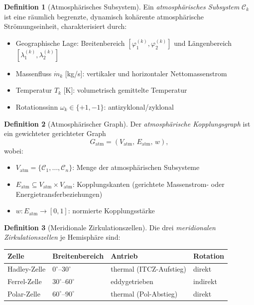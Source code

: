 ﻿\documentclass[a4paper,12pt]{article}
\theoremstyle{definition}
\newtheorem{definition}{Definition}
\begin{document}
\begin{definition}[Atmosph\"arisches Subsystem]
Ein \emph{atmosph\"arisches Subsystem} $\mathcal{C}_k$ ist eine r\"aumlich begrenzte,
dynamisch koh\"arente atmosph\"arische Str\"omungseinheit, charakterisiert durch:
\begin{itemize}
    \item Geographische Lage: Breitenbereich $[\varphi_1^{(k)}, \varphi_2^{(k)}]$
          und L\"angenbereich $[\lambda_1^{(k)}, \lambda_2^{(k)}]$
    \item Massenfluss $\dot{m}_k$ [kg/s]: vertikaler und horizontaler Nettomassenstrom
    \item Temperatur $T_k$ [K]: volumetrisch gemittelte Temperatur
    \item Rotationssinn $\omega_k \in \{+1, -1\}$: antizyklonal/zyklonal
\end{itemize}
\end{definition}

\begin{definition}[Atmosph\"arischer Graph]
Der \emph{atmosph\"arische Kopplungsgraph} ist ein gewichteter gerichteter Graph
\[
G_{\mathrm{atm}} = (V_{\mathrm{atm}},\, E_{\mathrm{atm}},\, w),
\]
wobei:
\begin{itemize}
    \item $V_{\mathrm{atm}} = \{\mathcal{C}_1, \ldots, \mathcal{C}_n\}$:
          Menge der atmosph\"arischen Subsysteme
    \item $E_{\mathrm{atm}} \subseteq V_{\mathrm{atm}} \times V_{\mathrm{atm}}$:
          Kopplungskanten (gerichtete Massenstrom- oder Energietransferbeziehungen)
    \item $w: E_{\mathrm{atm}} \to [0, 1]$: normierte Kopplungsst\"arke
\end{itemize}
\end{definition}

\begin{definition}[Meridionale Zirkulationszellen]
Die drei \emph{meridionalen Zirkulationszellen} je Hemisph\"are sind:
\begin{center}
\begin{tabular}{llll}
\toprule
Zelle & Breitenbereich & Antrieb & Rotation \\
\midrule
Hadley-Zelle  & $0^\circ$--$30^\circ$ & thermal (ITCZ-Aufstieg) & direkt \\
Ferrel-Zelle  & $30^\circ$--$60^\circ$ & eddygetrieben           & indirekt \\
Polar-Zelle   & $60^\circ$--$90^\circ$ & thermal (Pol-Abstieg)   & direkt \\
\bottomrule
\end{tabular}
\end{center}
\end{definition}
\end{document}
